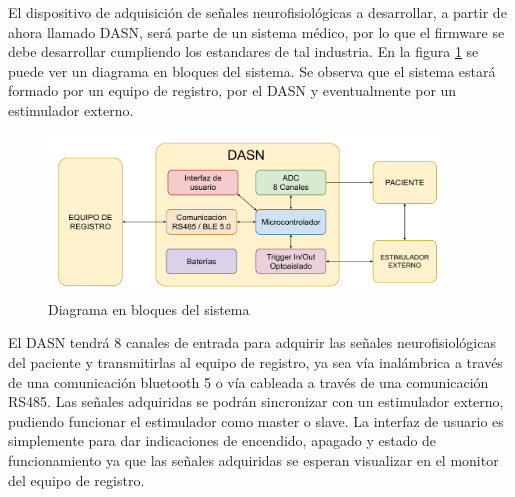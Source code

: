 \documentclass[
11pt, %
codirector, %
]{charter}
\begin{document}
El dispositivo de adquisición de señales neurofisiológicas a desarrollar, a partir de ahora llamado DASN, será parte de un sistema médico, por lo que el firmware se debe desarrollar cumpliendo los estandares de tal industria. En la figura \ref{fig:diagBloquesSistema} se puede ver un diagrama en bloques del sistema. Se observa que el sistema estará formado por un equipo de registro, por el DASN y eventualmente por un estimulador externo. 

\begin{figure}[htpb]
\centering 
\includegraphics[width=0.94\textwidth]{./Figuras/DiagramaEnBloquesDASN.pdf}
\caption{Diagrama en bloques del sistema}
\label{fig:diagBloquesSistema}
\end{figure}

El DASN tendrá 8 canales de entrada para adquirir las señales neurofisiológicas del paciente y transmitirlas al equipo de registro, ya sea vía inalámbrica a través de una comunicación bluetooth 5 o vía cableada a través de una comunicación RS485. Las señales adquiridas se podrán sincronizar con un estimulador externo, pudiendo funcionar el estimulador como master o slave. La interfaz de usuario es simplemente para dar indicaciones de encendido, apagado y estado de funcionamiento ya que las señales adquiridas se esperan visualizar en el monitor del equipo de registro.
\end{document}
